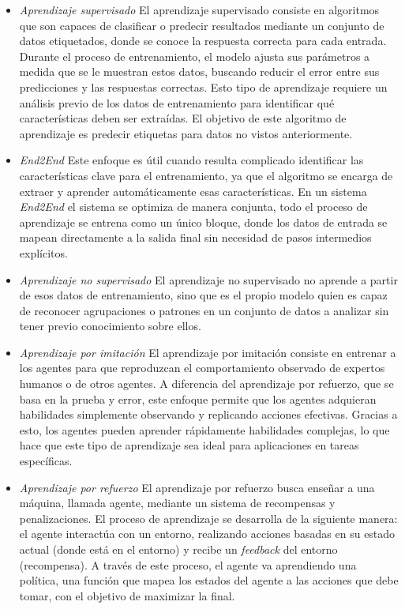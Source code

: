 \begin{itemize}
    \item \textit{Aprendizaje supervisado}  \cite{supervised-learning} El aprendizaje supervisado consiste en algoritmos que son capaces de clasificar o predecir resultados mediante un conjunto de datos etiquetados, donde se conoce la respuesta correcta para cada entrada. Durante el proceso de entrenamiento, el modelo ajusta sus parámetros a medida que se le muestran estos datos, buscando reducir el error entre sus predicciones y las respuestas correctas. Esto tipo de aprendizaje requiere un análisis previo de los datos de entrenamiento para identificar qué características deben ser extraídas. El objetivo de este algoritmo de aprendizaje es predecir etiquetas para datos no vistos anteriormente.

    \item \textit{End2End}  \cite{end2end-learning} Este enfoque es útil cuando resulta complicado identificar las características clave para el entrenamiento, ya que el algoritmo se encarga de extraer y aprender automáticamente esas características. En un sistema \textit{End2End} el sistema se optimiza de manera conjunta, todo el proceso de aprendizaje se entrena como un único bloque, donde los datos de entrada se mapean directamente a la salida final sin necesidad de pasos intermedios explícitos.
    
    \item \textit{Aprendizaje no supervisado} \cite{no-supervised-learning} El aprendizaje no supervisado no aprende a partir de esos datos de entrenamiento, sino que es el propio modelo quien es capaz de reconocer agrupaciones o patrones en un conjunto de datos a analizar sin tener previo conocimiento sobre ellos.

    \item \textit{Aprendizaje por imitación} \cite{imitation-learning} El aprendizaje por imitación consiste en entrenar a los agentes para que reproduzcan el comportamiento observado de expertos humanos o de otros agentes. A diferencia del aprendizaje por refuerzo, que se basa en la prueba y error, este enfoque permite que los agentes adquieran habilidades simplemente observando y replicando acciones efectivas. Gracias a esto, los agentes pueden aprender rápidamente habilidades complejas, lo que hace que este tipo de aprendizaje sea ideal para aplicaciones en tareas específicas.

    \item \textit{Aprendizaje por refuerzo}  \cite{imitation-learning} El aprendizaje por refuerzo busca enseñar a una máquina, llamada agente, mediante un sistema de recompensas y penalizaciones. El proceso de aprendizaje se desarrolla de la siguiente manera: el agente interactúa con un entorno, realizando acciones basadas en su estado actual (donde está en el entorno) y recibe un \textit{feedback} del entorno (recompensa). A través de este proceso, el agente va aprendiendo una política, una función que mapea los estados del agente a las acciones que debe tomar, con el objetivo de maximizar la final.

\end{itemize}

